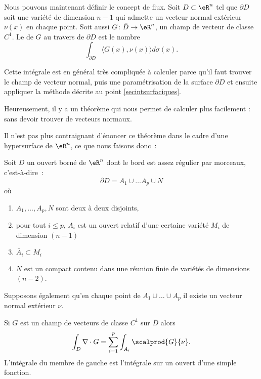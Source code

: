 Nous pouvons maintenant définir le concept de flux. Soit $D\subset \eR^n$ tel que $\partial D$ soit une variété de dimension $n-1$ qui admette un vecteur normal extérieur $\nu(x)$ en chaque point. Soit aussi $G\colon \bar D\to \eR^n$, un champ de vecteur de classe $C^1$. Le  de $G$ au travers de $\partial D$ est le nombre
\begin{equation}
	\int_{\partial D}\langle G(x), \nu(x)\rangle d\sigma(x).
\end{equation}

Cette intégrale est en général très compliquée à calculer parce qu'il faut trouver le champ de vecteur normal, puis une paramétrisation de la surface $\partial D$ et ensuite appliquer la méthode décrite au point \ref{secintsurfaciques}. 

Heureusement, il y a un théorème qui nous permet de calculer plus facilement : sans devoir trouver de vecteurs normaux.


Il n'est pas plus contraignant d'énoncer ce théorème dans le cadre d'une hypersurface de $\eR^n$, ce que nous faisons donc~:
\begin{theorem}
	Soit $D$ un ouvert borné de $\eR^n$ dont le bord est \og assez régulier par morceaux\fg{}, c'est-à-dire~:
	\begin{equation}
		\partial D = A_1 \cup \ldots A_p \cup N
	\end{equation} 
	où
	\begin{enumerate}
		\item $A_1, \ldots, A_p, N$ sont deux à deux disjoints,
		\item pour tout $i \leq p$, $A_i$ est un ouvert relatif d'une certaine variété $M_i$ de dimension $(n-1)$
		\item $\bar A_i \subset M_i$
		\item $N$ est un compact contenu dans une réunion finie de variétés de dimensions $(n-2)$.
	\end{enumerate}
	Supposons également qu'en chaque point de $A_1 \cup \ldots \cup A_p$ il existe un vecteur normal extérieur $\nu$.
	
	Si $G$ est un champ de vecteurs de classe $C^1$ sur $\bar D$ alors
	\begin{equation}
		\int_D \nabla\cdot G = \sum_{i=1}^p \int_{A_i} \scalprod{G}{\nu}.
	\end{equation}
	L'intégrale du membre de gauche est l'intégrale sur un ouvert d'une simple fonction.
\end{theorem}

